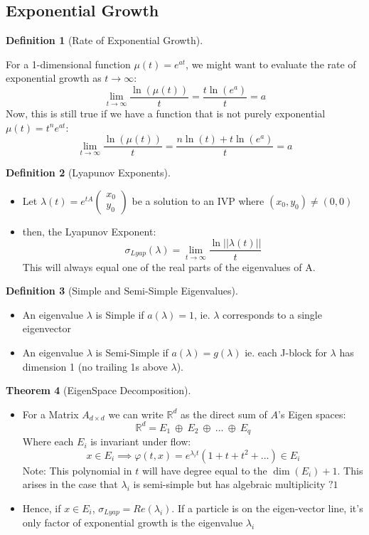 \documentclass{article}
\newtheorem{thm}{Theorem}[section]
\newtheorem{defn}[thm]{Definition}
\begin{document}
\subsection{Exponential Growth}
\begin{defn}[Rate of Exponential Growth]
\end{defn}
For a 1-dimensional function $\mu(t) = e^{at}$, we might want to evaluate the rate of exponential growth as $t \to \infty$:
    \[\lim_{t\to\infty} \frac{\ln(\mu(t))}{t} = \frac{t \ln(e^a)}{t} = a\]
Now, this is still true if we have a function that is not purely exponential $\mu(t) = t^ne^{at}$:
    \[ \lim_{t\to\infty} \frac{\ln(\mu(t))}{t} = \frac{n\ln(t) + t\ln(e^a)}{t} = a\]
    
\begin{defn}[Lyapunov Exponents]
\end{defn}
\begin{itemize}
    \item Let $\lambda(t) = e^{tA}\begin{pmatrix}
        x_0\\y_0
    \end{pmatrix}$ be a solution to an IVP where $(x_0, y_0) \neq (0,0)$
    \item then, the Lyapunov Exponent:
    \[ \sigma_{Lyap}(\lambda) = \lim_{t\to\infty}\frac{\ln||\lambda(t)||}{t}\]
    This will always equal one of the real parts of the eigenvalues of A.
\end{itemize}

\newpage
\begin{defn}[Simple and Semi-Simple Eigenvalues]
\end{defn}
\begin{itemize}
    \item An eigenvalue $\lambda$ is Simple if $a(\lambda) = 1$, ie. $\lambda$ corresponds to a single eigenvector
    
    \item An eigenvalue $\lambda$ is Semi-Simple if $a(\lambda) = g(\lambda)$
    ie. each J-block for $\lambda$ has dimension 1 (no trailing 1s above $\lambda$).
    
\end{itemize}

\begin{thm}[EigenSpace Decomposition]
\end{thm}
\begin{itemize}
    \item For a Matrix $A_{d\times d}$ we can write $\mathbb{R}^d$ as the direct sum of $A$'s Eigen spaces:
    \[\mathbb{R}^d = E_1 \:\oplus\: E_2 \:\oplus\: ... \:\oplus\: E_q\]
    Where each $E_i$ is invariant under flow: 
    \[x \in E_i \implies \varphi(t, x) = e^{\lambda_i t} (1 + t + t^2 + ...) \in E_i\]
    Note: This polynomial in $t$ will have degree equal to the $\dim(E_i) + 1$. This arises in the case that $\lambda_i$ is semi-simple but has algebraic multiplicity $? 1$

    \item Hence, if $x \in E_i$, $\sigma_{Lyap} = Re(\lambda_i)$. If a particle is on the eigen-vector line, it's only factor of exponential growth is the eigenvalue $\lambda_i$
\end{itemize}
\end{document}
